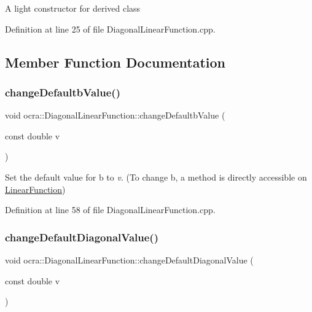 A light constructor for derived class 

Definition at line 25 of file Diagonal\+Linear\+Function.\+cpp.



\subsection{Member Function Documentation}
\hypertarget{classocra_1_1DiagonalLinearFunction_a728b7f4b453ad06f385601b736290979}{}\label{classocra_1_1DiagonalLinearFunction_a728b7f4b453ad06f385601b736290979} 
\subsubsection{\texorpdfstring{change\+Defaultb\+Value()}{changeDefaultbValue()}}
{\footnotesize\ttfamily void ocra\+::\+Diagonal\+Linear\+Function\+::change\+Defaultb\+Value (\begin{DoxyParamCaption}\item[{const double}]{v }\end{DoxyParamCaption})}

Set the default value for b to {\itshape v}. (To change b, a method is directly accessible on \hyperlink{classocra_1_1LinearFunction}{Linear\+Function}) 

Definition at line 58 of file Diagonal\+Linear\+Function.\+cpp.

\hypertarget{classocra_1_1DiagonalLinearFunction_a8912906e227dc8ebce7339eceb09e72e}{}\label{classocra_1_1DiagonalLinearFunction_a8912906e227dc8ebce7339eceb09e72e} 
\subsubsection{\texorpdfstring{change\+Default\+Diagonal\+Value()}{changeDefaultDiagonalValue()}}
{\footnotesize\ttfamily void ocra\+::\+Diagonal\+Linear\+Function\+::change\+Default\+Diagonal\+Value (\begin{DoxyParamCaption}\item[{const double}]{v }\end{DoxyParamCaption})}

